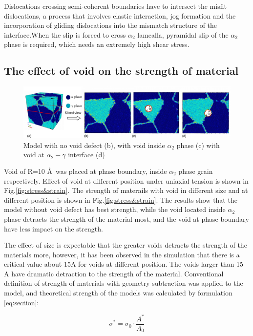 \documentclass[metals,article,submit,moreauthors,pdftex,10pt,a4paper]{Definitions/mdpi}
\begin{document}
Dislocations crossing semi-coherent boundaries have to intersect the misfit dislocations, a process that involves elastic interaction, jog formation and the incorporation of gliding dislocations into the mismatch structure of the interface.When the slip is forced to cross $\alpha_2$ lamealla, pyramidal slip of the $\alpha_2$ phase is required, which needs an extremely high shear stress.


\subsection{The effect of void on the strength of material}

\begin{figure}[ht]
	\centering
	\includegraphics[width=1\linewidth]{img/models}
	\caption{ Model with no void defect (b), with void inside $\alpha_2$ phase (c) with void at $\alpha_2-\gamma$ interface (d)}
	\label{fig:model-creation}
\end{figure}


Void of R=10 \AA\ was placed at phase boundary, inside $\alpha_2$ phase grain respectively. Effect of void at different position under uniaxial tension is shown in Fig.\ref{fig:stress&strain}. The strength of materails with void in different size and at different position is shown in Fig.\ref{fig:stress&strain}. The results show that the model without void defect has best strength, while the void located inside $\alpha_2$ phase detracts the strength of the material most, and the void at phase boundary have less impact on the strength.
           
The effect of size is expectable that the greater voids detracts the strength of the materials more, however, it has been observed in the simulation that there is a critical value about 15A for voids at different position. The voids larger than 15 A have dramatic detraction to the strength of the material. Conventional definition of strength of materials with geometry subtraction was applied to the model, and theoretical strength of the models was calculated by formulation \ref{eq:section}:
	
	\begin{equation} \label{eq:section} 
	\sigma^* = \sigma_0 \cdot \frac{A^*}{A_0}
	\end{equation}
	
\end{document}
